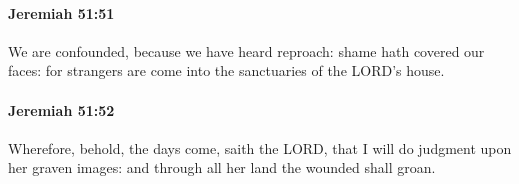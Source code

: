 		\paragraph{Jeremiah 51:51} %
			\label{JEREMIAH-51-51}

			We are confounded, because we have heard reproach: shame hath covered our faces: for strangers are come into the sanctuaries of the LORD’s house.


		\paragraph{Jeremiah 51:52} %
			\label{JEREMIAH-51-52}

			Wherefore, behold, the days come, saith the LORD, that I will do judgment upon her graven images: and through all her land the wounded shall groan.


